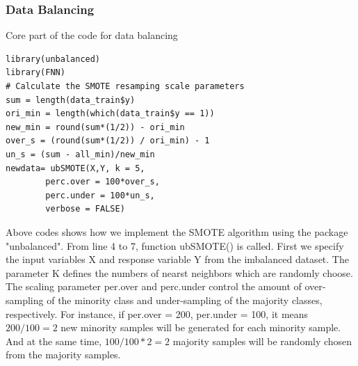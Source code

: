      \subsubsection{Data Balancing}
	 \noindent Core part of the code for data balancing
     \begin{lstlisting}
library(unbalanced)
library(FNN)
# Calculate the SMOTE resamping scale parameters
sum = length(data_train$y)
ori_min = length(which(data_train$y == 1))
new_min = round(sum*(1/2)) - ori_min
over_s = (round(sum*(1/2)) / ori_min) - 1 
un_s = (sum - all_min)/new_min 
newdata= ubSMOTE(X,Y, k = 5,
		perc.over = 100*over_s,
		perc.under = 100*un_s,
		verbose = FALSE)
     \end{lstlisting}
     Above codes shows how we implement the SMOTE algorithm using the package "unbalanced". From line 4 to 7, function ubSMOTE() is called. First we specify the input variables X and response variable Y from the imbalanced dataset. The parameter K defines the numbers of nearst neighbors which are randomly choose. The scaling parameter per.over and perc.under control the amount of over-sampling of the minority class and under-sampling of the majority classes, respectively. For instance, if per.over = 200, per.under = 100, it means $200/100 = 2$ new minority samples will be generated for each minority sample. And at the same time, $100/100 *2 = 2 $ majority samples will be randomly chosen from the majority samples. 
